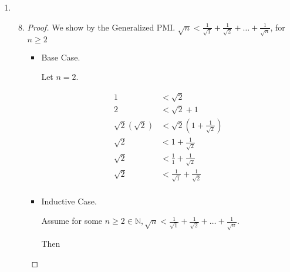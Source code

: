 \documentclass[12pt,letterpaper]{article}
\begin{document}
\begin{enumerate}
\begin{enumerate}
\begin{enumerate}
\begin{proof}
\begin{itemize}
                    we have $\frac{n^3}{3} + \frac{n^5}{5} + \frac{7n}{15} + 1 + n^4 + 2n^3 + 3n^2 + 2n \in \mathbb{N}$.

                    Thus $\frac{\left(n + 1\right)^3}{3} + \frac{\left(n + 1\right)^5}{5} + \frac{7\left(n + 1\right)}{15} \in \mathbb{N}$

                  \item
                    From the Base case and the inductive case,
                    we use the PMI to state $\frac{n^3}{3} + \frac{n^5}{5} + \frac{7n}{15} \in \mathbb{N}, \forall n \in \mathbb{N}$
                \end{itemize}
              \end{proof}
          \end{enumerate}
        \item
          \begin{enumerate}
            \setcounter{enumiii}{7}
            \item
              \begin{proof}
                We show by the Generalized PMI.
                $\sqrt{n} < \frac{1}{\sqrt{1}} + \frac{1}{\sqrt{2}} + \dots + \frac{1}{\sqrt{n}}$, for $n \geq 2$
                \begin{itemize}
                  \item Base Case.

                    Let $n = 2$.

                    \begin{align*}
                      1 &< \sqrt{2} \\
                      2 &< \sqrt{2} + 1 \\
                      \sqrt{2}\left(\sqrt{2}\right) &< \sqrt{2}\left(1 + \frac{1}{\sqrt{2}}\right) \\
                      \sqrt{2} &< 1 + \frac{1}{\sqrt{2}} \\
                      \sqrt{2} &< \frac{1}{1} + \frac{1}{\sqrt{2}} \\
                      \sqrt{2} &< \frac{1}{\sqrt{1}} + \frac{1}{\sqrt{2}} \\
                    \end{align*}
                  \item Inductive Case.

                    Assume for some $n \geq 2 \in \mathbb{N}, \sqrt{n} < \frac{1}{\sqrt{1}} + \frac{1}{\sqrt{2}} + \dots + \frac{1}{\sqrt{n}}$.

                    Then


\end{itemize}
\end{proof}
\end{enumerate}
\end{enumerate}
\end{enumerate}
\end{document}
